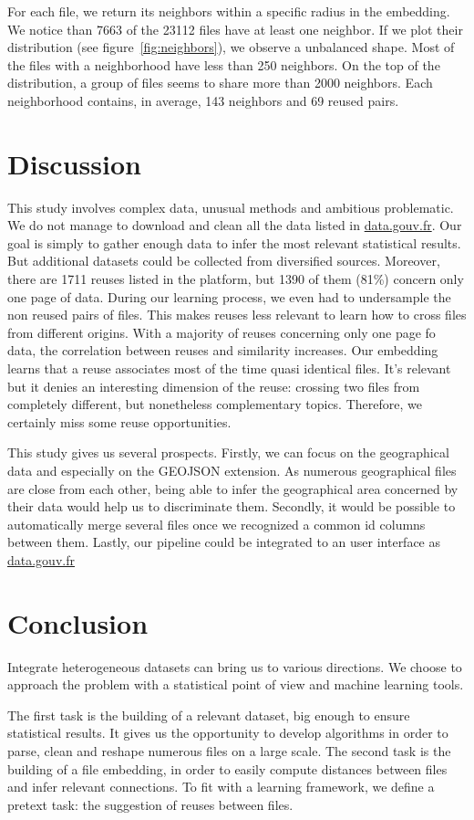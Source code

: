 \documentclass[a4paper]{article}
\begin{document}
	For each file, we return its neighbors within a specific radius in the embedding. We notice than 7663 of the 23112 files have at least one neighbor. If we plot their distribution (see figure~\ref{fig:neighbors}), we observe a unbalanced shape. Most of the files with a neighborhood have less than 250 neighbors. On the top of the distribution, a group of files seems to share more than 2000 neighbors. Each neighborhood contains, in average, 143 neighbors and 69 reused pairs.
	
	\section{Discussion}
	
	This study involves complex data, unusual methods and ambitious problematic. We do not manage to download and clean all the data listed in \href{http://www.data.gouv.fr/fr/}{data.gouv.fr}. Our goal is simply to gather enough data to infer the most relevant statistical results. But additional datasets could be collected from diversified sources. Moreover, there are 1711 reuses listed in the platform, but 1390 of them (81\%) concern only one page of data. During our learning process, we even had to undersample the non reused pairs of files. This makes reuses less relevant to learn how to cross files from different origins. With a majority of reuses concerning only one page fo data, the correlation between reuses and similarity increases. Our embedding learns that a reuse associates most of the time quasi identical files. It's relevant but it denies an interesting dimension of the reuse: crossing two files from completely different, but nonetheless complementary topics. Therefore, we certainly miss some reuse opportunities.
	
	This study gives us several prospects. Firstly, we can focus on the geographical data and especially on the GEOJSON extension. As numerous geographical files are close from each other, being able to infer the geographical area concerned by their data would help us to discriminate them. Secondly, it would be possible to automatically merge several files once we recognized a common id columns between them. Lastly, our pipeline could be integrated to an user interface as \href{http://www.data.gouv.fr/fr/}{data.gouv.fr}

	\section{Conclusion}	
	
	Integrate heterogeneous datasets can bring us to various directions. We choose to approach the problem with a statistical point of view and machine learning tools. 
	
	The first task is the building of a relevant dataset, big enough to ensure statistical results. It gives us the opportunity to develop algorithms in order to parse, clean and reshape numerous files on a large scale. The second task is the building of a file embedding, in order to easily compute distances between files and infer relevant connections. To fit with a learning framework, we define a pretext task: the suggestion of reuses between files.
	
	
	
\end{document}
